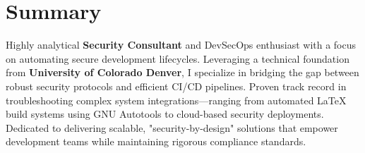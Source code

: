 \section{Summary}
\noindent
Highly analytical \textbf{Security Consultant} and DevSecOps enthusiast with a focus on automating secure development lifecycles. 
Leveraging a technical foundation from \textbf{University of Colorado Denver}, I specialize in bridging the gap between 
robust security protocols and efficient CI/CD pipelines. Proven track record in troubleshooting complex system 
integrations—ranging from automated LaTeX build systems using GNU Autotools to cloud-based security deployments. 
Dedicated to delivering scalable, "security-by-design" solutions that empower development teams while 
maintaining rigorous compliance standards.